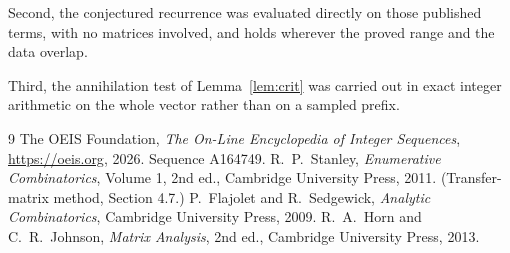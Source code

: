 \documentclass[11pt,a4paper]{article}
\theoremstyle{plain}
\theoremstyle{definition}
\begin{document}
Second, the conjectured recurrence was evaluated directly on those published terms, with no
matrices involved, and holds wherever the proved range and the data overlap.

Third, the annihilation test of Lemma~\ref{lem:crit} was carried out in exact integer
arithmetic on the whole vector rather than on a sampled prefix.

\begin{thebibliography}{9}
 The OEIS Foundation, \emph{The On-Line Encyclopedia of Integer
Sequences}, \url{https://oeis.org}, 2026. Sequence A164749.
 R.~P.~Stanley, \emph{Enumerative Combinatorics}, Volume 1, 2nd ed.,
Cambridge University Press, 2011. (Transfer-matrix method, Section 4.7.)
 P.~Flajolet and R.~Sedgewick, \emph{Analytic Combinatorics}, Cambridge
University Press, 2009.
 R.~A.~Horn and C.~R.~Johnson, \emph{Matrix Analysis}, 2nd ed., Cambridge
University Press, 2013.
\end{thebibliography}
\end{document}
